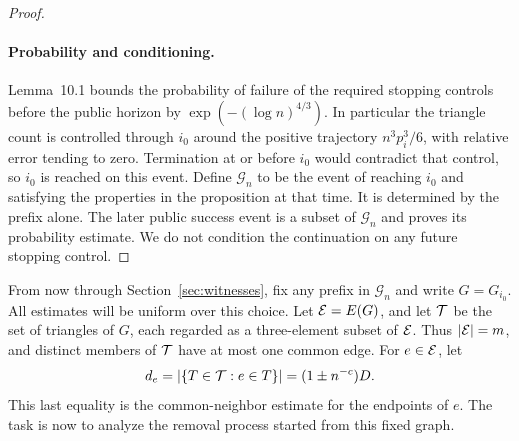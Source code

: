 \begin{proof}
\paragraph{Probability and conditioning.}
Lemma~10.1 bounds the probability of failure of the required stopping
controls before the public horizon by
$\exp(- (\log n)^{4/3})$. In particular the triangle count is controlled
through $i_0$ around the positive trajectory $n^3p_i^3/6$, with relative
error tending to zero. Termination at or before $i_0$ would contradict
that control, so $i_0$ is reached on this event.
Define $\mathcal G_n$ to be the event of reaching $i_0$ and satisfying
the properties in the proposition at that time. It is determined by
the prefix alone. The later public success event is a subset of
$\mathcal G_n$ and proves its probability estimate. We do not condition
the continuation on any future stopping control.
\end{proof}

From now through Section~\ref{sec:witnesses}, fix any prefix in
$\mathcal G_n$ and write $G=G_{i_0}$. All estimates will be uniform over
this choice. Let $\mathcal E=E(G)$, and let $\mathcal T$ be the set of triangles of
$G$, each regarded as a three-element subset of $\mathcal E$. Thus $|\mathcal E|=m$,
and distinct members of $\mathcal T$ have at most one common edge. For
$e\in\mathcal E$, let
\[
 d_e=|\{T\in\mathcal T:e\in T\}|=(1\pm n^{-c})D.
\]
This last equality is the common-neighbor estimate for the endpoints
of $e$. The task is now to analyze the removal process started from
this fixed graph.
